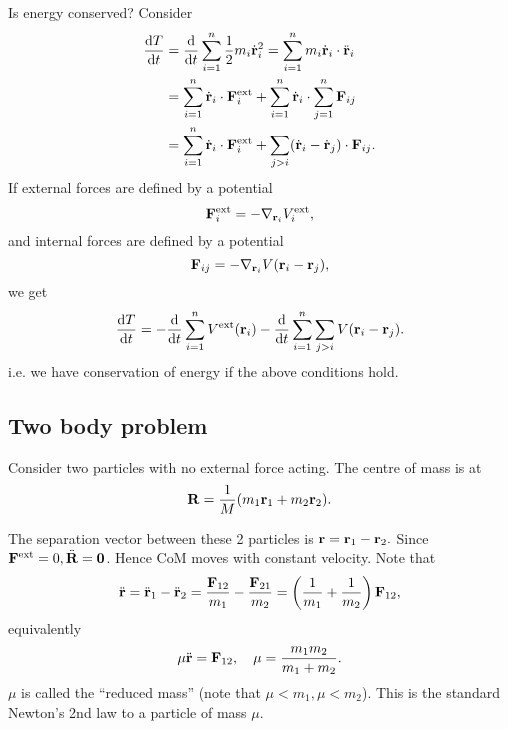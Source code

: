 Is energy conserved? Consider 
\begin{align*}
    \frac{\mathrm{d}T}{\mathrm{d}t} &= \frac{\mathrm{d}}{\mathrm{d}t}\sum_{i=1}^{n}\frac{1}{2}m_i \dot{{\bf r}}_i^2 = \sum_{i=1}^{n}m_i \dot{{\bf r}}_i \cdot \ddot{{\bf r}}_i\\
    &= \sum_{i=1}^{n} \dot{{\bf r}}_i \cdot {\bf F}_i^{\text{ext}}+\sum_{i=1}^{n}\dot{{\bf r}}_i \cdot \sum_{j=1}^{n}{\bf F}_{ij}\\ 
    &= \sum_{i=1}^{n} \dot{{\bf r}}_i \cdot {\bf F}_i^{\text{ext}}+ \sum_{j>i} (\dot{{\bf r}}_i-\dot{{\bf r}}_j)\cdot {\bf F}_{ij}.
\end{align*}
If external forces are defined by a potential 
\[
    {\bf F}_{i}^{\text{ext}} = - \nabla_{{\bf r}_i} V_i^{\text{ext}},
\]
and internal forces are defined by a potential 
\[
    {\bf F}_{ij} = -\nabla _{{\bf r}_i} V({\bf r}_i-{\bf r}_j),
\]
we get 
\[
    \frac{\mathrm{d}T}{\mathrm{d}t} = - \frac{\mathrm{d}}{\mathrm{d}t}\sum_{i=1}^{n}V^{\text{ext}}({\bf r}_i) - \frac{\mathrm{d}}{\mathrm{d}t}\sum_{i=1}^{n}\sum_{j>i} V({\bf r}_i-{\bf r}_j).
\]
i.e. we have conservation of energy if the above conditions hold.

\subsection{Two body problem}
Consider two particles with no external force acting. The centre of mass is at 
\[
    {\bf R} = \frac{1}{M}(m_1{\bf r}_1+m_2{\bf r}_2).
\]
\begin{center}
\end{center}
The separation vector between these 2 particles is $ {\bf r}={\bf r}_1-{\bf r}_2. $ Since $ {\bf F}^{\text{ext}}=0, \ddot{{\bf R}}=\mathbf{0} $. Hence CoM moves with constant velocity. Note that 
\[
    \ddot{{\bf r}} = \ddot{{\bf r}}_1-\ddot{{\bf r}}_2 = \frac{{\bf F}_{12}}{m_1}-\frac{{\bf F}_{21}}{m_2} = \left( \frac{1}{m_1}+\frac{1}{m_2} \right){\bf F}_{12} ,
\]
equivalently 
\[
    \mu \ddot{{\bf r}} = {\bf F}_{12},\quad \mu = \frac{m_1m_2}{m_1+m_2}.
\]
$ \mu $ is called the ``reduced mass'' (note that $ \mu<m_1,\mu<m_2 $). This is the standard Newton's 2nd law to a particle of mass $ \mu $.

